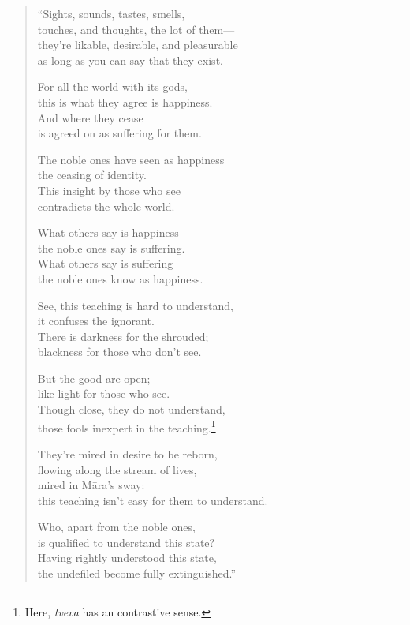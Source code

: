 \documentclass[12pt,openany]{book}%
\begin{document}
\begin{verse}%
“Sights, sounds, tastes, smells, \\
touches, and thoughts, the lot of them—\\
they’re likable, desirable, and pleasurable \\
as long as you can say that they exist. 

For all the world with its gods, \\
this is what they agree is happiness. \\
And where they cease \\
is agreed on as suffering for them. 

The noble ones have seen as happiness \\
the ceasing of identity. \\
This insight by those who see \\
contradicts the whole world. 

What others say is happiness \\
the noble ones say is suffering. \\
What others say is suffering \\
the noble ones know as happiness. 

See, this teaching is hard to understand, \\
it confuses the ignorant. \\
There is darkness for the shrouded; \\
blackness for those who don’t see. 

But the good are open; \\
like light for those who see. \\
Though close, they do not understand, \\
those fools inexpert in the teaching.\footnote{Here, \textit{tveva} has an contrastive sense. } 

They’re mired in desire to be reborn, \\
flowing along the stream of lives, \\
mired in \textsanskrit{Māra}’s sway: \\
this teaching isn’t easy for them to understand. 

Who, apart from the noble ones, \\
is qualified to understand this state? \\
Having rightly understood this state, \\
the undefiled become fully extinguished.” 

%
\end{verse}
\end{document}
